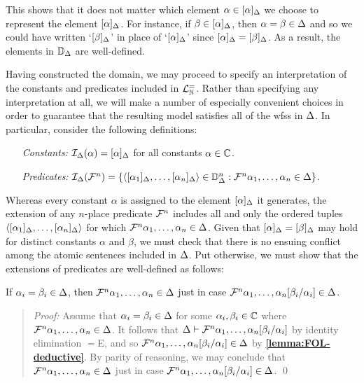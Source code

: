 This shows that it does not matter which element $\alpha\in[\alpha]_{\Delta}$ we choose to represent the element $[\alpha]_{\Delta}$.
For instance, if $\beta\in[\alpha]_{\Delta}$, then $\alpha=\beta\in\Delta$ and so we could have written `$[\beta]_{\Delta}$' in place of `$[\alpha]_{\Delta}$' since $[\alpha]_{\Delta}=[\beta]_{\Delta}$.
As a result, the elements in $\mathbb{D}_{\Delta}$ are well-defined. 

Having constructed the domain, we may proceed to specify an interpretation of the constants and predicates included in $\mathcal{L}^{=}_{\mathbb{N}}$.
Rather than specifying any interpretation at all, we will make a number of especially convenient choices in order to guarantee that the resulting model satisfies all of the wfss in $\Delta$.
In particular, consider the following definitions:
  \begin{enumerate}[leftmargin=1.5in]
    \item[\it Constants:] $\mathcal{I}_{\Delta}(\alpha)=[\alpha]_{\Delta}$ for all constants $\alpha\in\mathbb{C}$. 
    \item[\it Predicates:] $\mathcal{I}_{\Delta}(\mathcal{F}^n)=\lbrace\langle[\alpha_1]_{\Delta},\ldots,[\alpha_n]_{\Delta}\rangle\in\mathbb{D}_{\Delta}^n:\mathcal{F}^n\alpha_1,\ldots,\alpha_n\in\Delta\rbrace$.
  \end{enumerate}
Whereas every constant $\alpha$ is assigned to the element $[\alpha]_{\Delta}$ it generates, the extension of any $n$-place predicate $\mathcal{F}^n$ includes all and only the ordered tuples $\langle[\alpha_1]_{\Delta},\ldots,[\alpha_n]_{\Delta}\rangle$ for which $\mathcal{F}^n\alpha_1,\ldots,\alpha_n\in\Delta$.
Given that $[\alpha]_{\Delta}=[\beta]_{\Delta}$ may hold for distinct constants $\alpha$ and $\beta$, we must check that there is no ensuing conflict among the atomic sentences included in $\Delta$.
Put otherwise, we must show that the extensions of predicates are well-defined as follows:





\begin{Lthm} \label{lemma:FOL-preddef}
  If $\alpha_i=\beta_i\in\Delta$, then $\mathcal{F}^n\alpha_1,\ldots,\alpha_n\in\Delta$ just in case $\mathcal{F}^n\alpha_1,\ldots,\alpha_n[\beta_i/\alpha_i]\in\Delta$.
\end{Lthm}

\begin{quote} 
  \textit{Proof:} 
  Assume that $\alpha_i=\beta_i\in\Delta$ for some $\alpha_i,\beta_i\in\mathbb{C}$ where $\mathcal{F}^n\alpha_1,\ldots,\alpha_n\in\Delta$.
  It follows that $\Delta\vdash\mathcal{F}^n\alpha_1,\ldots,\alpha_n[\beta_i/\alpha_i]$ by identity elimination $=$E, and so $\mathcal{F}^n\alpha_1,\ldots,\alpha_n[\beta_i/\alpha_i]\in\Delta$ by \textbf{\ref{lemma:FOL-deductive}}.
  By parity of reasoning, we may conclude that $\mathcal{F}^n\alpha_1,\ldots,\alpha_n\in\Delta$ just in case $\mathcal{F}^n\alpha_1,\ldots,\alpha_n[\beta_i/\alpha_i]\in\Delta$.
  \qed
\end{quote}


